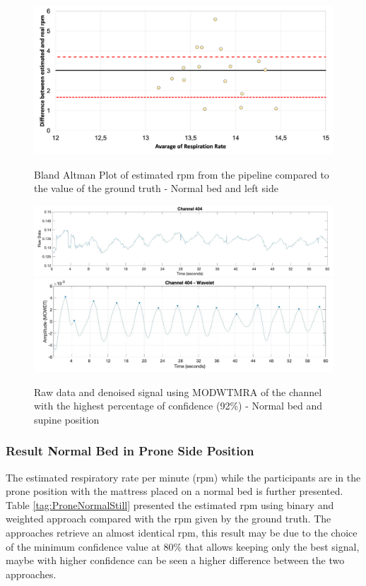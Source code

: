 \begin{figure}[p]
  \centering
  \includegraphics[width=\textwidth]{img/balnd2.png}

  \caption{Bland Altman Plot of estimated rpm from the pipeline compared to the value of the ground truth - Normal bed and left side}
  \label{fig:baln2}
  \vspace{1.5cm}
  \includegraphics[width=\textwidth]{img/404.jpg}
  \includegraphics[width=\textwidth]{img/404_wave.jpg}
\caption{Raw data and denoised signal using MODWTMRA of the channel with the highest percentage of confidence (92\%) - Normal bed and supine position}
  \label{fig:rec}
\end{figure}


\clearpage
\subsubsection{Result Normal Bed in Prone Side Position}   \label{cap:ResultNormalBed3}

The estimated respiratory rate per minute (rpm) while the participants are in the prone position with the mattress placed on a normal bed is further presented. Table \ref{tag:ProneNormalStill} presented the estimated rpm using binary and weighted approach compared with the rpm given by the ground truth. The approaches retrieve an almost identical rpm, this result may be due to the choice of the minimum confidence value at 80\% that allows keeping only the best signal, maybe with higher confidence can be seen a higher difference between the two approaches. 


